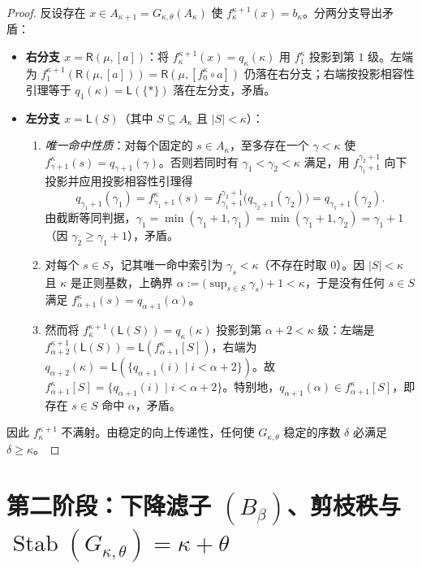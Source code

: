 \documentclass[11pt,a4paper]{ctexart}
\theoremstyle{definition}
\theoremstyle{plain}
\newcommand{\Stab}{\operatorname{Stab}}
\begin{document}
\begin{proof}
反设存在 $x \in A_{\kappa+1} = G_{\kappa,\theta}(A_\kappa)$ 使 $f_\kappa^{\kappa+1}(x) = b_\kappa$。分两分支导出矛盾：
\begin{itemize}[leftmargin=2em]
  \item \textbf{右分支 $x = \mathsf{R}(\mu, [a])$}：将 $f_\kappa^{\kappa+1}(x) = q_\kappa(\kappa)$ 用 $f_1^\kappa$ 投影到第 $1$ 级。左端为 $f_1^{\kappa+1}(\mathsf{R}(\mu, [a])) = \mathsf{R}(\mu, [f_0^\kappa \circ a])$ 仍落在右分支；右端按投影相容性引理等于 $q_1(\kappa) = \mathsf{L}(\{*\})$ 落在左分支，矛盾。
  \item \textbf{左分支 $x = \mathsf{L}(S)$}（其中 $S \subseteq A_\kappa$ 且 $|S| < \kappa$）：
    \begin{enumerate}[label=(\arabic*)]
      \item \emph{唯一命中性质}：对每个固定的 $s \in A_\kappa$，至多存在一个 $\gamma < \kappa$ 使 $f_{\gamma+1}^\kappa(s) = q_{\gamma+1}(\gamma)$。否则若同时有 $\gamma_1 < \gamma_2 < \kappa$ 满足，用 $f_{\gamma_1+1}^{\gamma_2+1}$ 向下投影并应用投影相容性引理得
        \[
          q_{\gamma_1+1}(\gamma_1) = f_{\gamma_1+1}^\kappa(s) = f_{\gamma_1+1}^{\gamma_2+1}\bigl(q_{\gamma_2+1}(\gamma_2)\bigr) = q_{\gamma_1+1}(\gamma_2).
        \]
        由截断等同判据，$\gamma_1 = \min(\gamma_1+1, \gamma_1) = \min(\gamma_1+1, \gamma_2) = \gamma_1 + 1$（因 $\gamma_2 \ge \gamma_1+1$），矛盾。
      \item 对每个 $s \in S$，记其唯一命中索引为 $\gamma_s < \kappa$（不存在时取 $0$）。因 $|S| < \kappa$ 且 $\kappa$ 是正则基数，上确界 $\alpha := \bigl(\sup_{s \in S} \gamma_s\bigr) + 1 < \kappa$，于是没有任何 $s \in S$ 满足 $f_{\alpha+1}^\kappa(s) = q_{\alpha+1}(\alpha)$。
      \item 然而将 $f_\kappa^{\kappa+1}(\mathsf{L}(S)) = q_\kappa(\kappa)$ 投影到第 $\alpha + 2 < \kappa$ 级：左端是 $f_{\alpha+2}^{\kappa+1}(\mathsf{L}(S)) = \mathsf{L}(f_{\alpha+1}^\kappa[S])$，右端为 $q_{\alpha+2}(\kappa) = \mathsf{L}(\{ q_{\alpha+1}(i) \mid i < \alpha + 2 \})$。故 $f_{\alpha+1}^\kappa[S] = \{ q_{\alpha+1}(i) \mid i < \alpha + 2 \}$。特别地，$q_{\alpha+1}(\alpha) \in f_{\alpha+1}^\kappa[S]$，即存在 $s \in S$ 命中 $\alpha$，矛盾。
    \end{enumerate}
\end{itemize}
因此 $f_\kappa^{\kappa+1}$ 不满射。由稳定的向上传递性，任何使 $G_{\kappa,\theta}$ 稳定的序数 $\delta$ 必满足 $\delta \ge \kappa$。
\end{proof}

\section{第二阶段：下降滤子 $(B_\beta)$、剪枝秩与 $\Stab(G_{\kappa,\theta}) = \kappa + \theta$}
\end{document}
